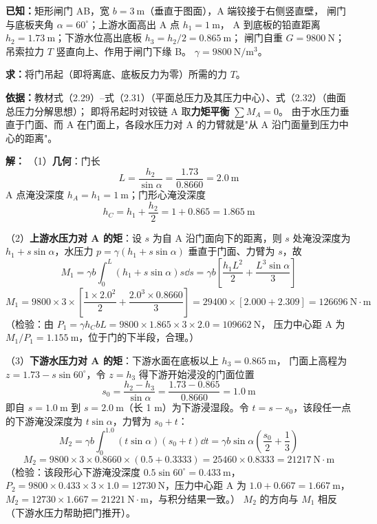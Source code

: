 \begin{jie}
\textbf{已知：}矩形闸门 AB，宽 $b=3\ \mathrm{m}$（垂直于图面），A 端铰接于右侧竖直壁，
闸门与底板夹角 $\alpha=60^{\circ}$；上游水面高出 A 点 $h_1=1\ \mathrm{m}$，
A 到底板的铅直距离 $h_2=1.73\ \mathrm{m}$；下游水位高出底板 $h_3=h_2/2=0.865\ \mathrm{m}$；
闸门自重 $G=9800\ \mathrm{N}$；吊索拉力 $T$ 竖直向上、作用于闸门下缘 B。
$\gamma=9800\ \mathrm{N/m^3}$。

\textbf{求：}将门吊起（即将离底、底板反力为零）所需的力 $T$。

\textbf{依据：}教材式（2.29）--式（2.31）（平面总压力及其压力中心）、式（2.32）（曲面总压力分解思想）；
即将吊起时对铰链 A 取\textbf{力矩平衡} $\sum M_A=0$。
由于水压力垂直于门面、而 A 在门面上，各段水压力对 A 的力臂就是"从 A 沿门面量到压力中心的距离"。

\textbf{解：}
（1）\textbf{几何}：门长
\[ L=\frac{h_2}{\sin\alpha}=\frac{1.73}{0.8660}=2.0\ \mathrm{m} \]
A 点淹没深度 $h_A=h_1=1\ \mathrm{m}$；门形心淹没深度
\[ h_C=h_1+\frac{h_2}{2}=1+0.865=1.865\ \mathrm{m} \]

（2）\textbf{上游水压力对 A 的矩}：设 $s$ 为自 A 沿门面向下的距离，则 $s$ 处淹没深度为
$h_1+s\sin\alpha$，水压力 $p=\gamma\left(h_1+s\sin\alpha\right)$ 垂直于门面、力臂为 $s$，故
\[ M_1=\gamma b\int_0^{L}\left(h_1+s\sin\alpha\right)s\dd s
=\gamma b\left[\frac{h_1L^2}{2}+\frac{L^3\sin\alpha}{3}\right] \]
\[ M_1=9800\times3\times\left[\frac{1\times2.0^2}{2}+\frac{2.0^3\times0.8660}{3}\right]
=29400\times\left[2.000+2.309\right]=126696\ \mathrm{N\cdot m} \]
（检验：由 $P_1=\gamma h_C bL=9800\times1.865\times3\times2.0=109662\ \mathrm{N}$，
压力中心距 A 为 $M_1/P_1=1.155\ \mathrm{m}$，位于门的下半段，合理。）

（3）\textbf{下游水压力对 A 的矩}：下游水面在底板以上 $h_3=0.865\ \mathrm{m}$，
门面上高程为 $z=1.73-s\sin60^{\circ}$，令 $z=h_3$ 得下游开始浸没的门面位置
\[ s_0=\frac{h_2-h_3}{\sin\alpha}=\frac{1.73-0.865}{0.8660}=1.0\ \mathrm{m} \]
即自 $s=1.0\ \mathrm{m}$ 到 $s=2.0\ \mathrm{m}$（长 1 m）为下游浸湿段。令 $t=s-s_0$，该段任一点的下游淹没深度为 $t\sin\alpha$，力臂为 $s_0+t$：
\[ M_2=\gamma b\int_0^{1.0}\left(t\sin\alpha\right)\left(s_0+t\right)\dd t
=\gamma b\sin\alpha\left(\frac{s_0}{2}+\frac{1}{3}\right) \]
\[ M_2=9800\times3\times0.8660\times(0.5+0.3333)=25460\times0.8333=21217\ \mathrm{N\cdot m} \]
（检验：该段形心下游淹没深度 $0.5\sin60^{\circ}=0.433\ \mathrm{m}$，
$P_2=9800\times0.433\times3\times1.0=12730\ \mathrm{N}$，压力中心距 A 为 $1.0+0.667=1.667\ \mathrm{m}$，
$M_2=12730\times1.667=21221\ \mathrm{N\cdot m}$，与积分结果一致。）
$M_2$ 的方向与 $M_1$ 相反（下游水压力帮助把门推开）。


\end{jie}
